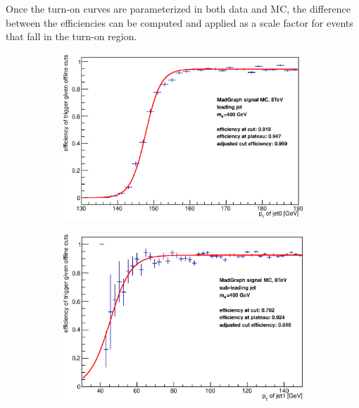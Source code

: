 Once the turn-on curves are parameterized in both data and MC, the difference between the efficiencies
can be computed and applied as a scale factor for events that fall in the turn-on region.  


\begin{figure}[phtb!]
  \begin{center}
  \begin{subfigure}[leading jet, $m_{A}=400$ GeV]{0.4\textwidth}\includegraphics[width=\textwidth]{Systematics/images/jet0_trigger_turn_on_bAbb_400_j35.eps}\end{subfigure}
  \begin{subfigure}[sub-leading jet, $m_{A}=400$ GeV]{0.4\textwidth}\includegraphics[width=\textwidth]{Systematics/images/jet1_trigger_turn_on_bAbb_400_j35.eps}\end{subfigure}

\end{center}
\end{figure}
